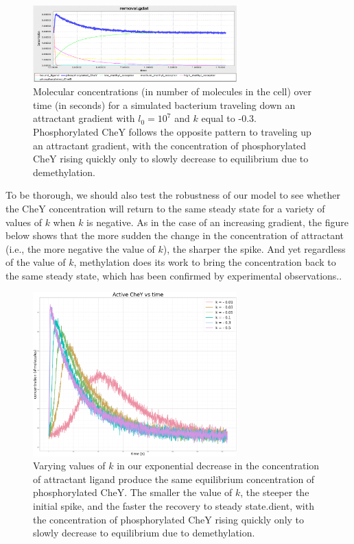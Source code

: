 \begin{figure}[h]
\centering
\mySfFamily
\includegraphics[width = 0.7\textwidth]{../images/chemotaxis_tutorial_removal01.png}
\caption{Molecular concentrations (in number of molecules in the cell) over time (in seconds) for a simulated bacterium traveling down an attractant gradient with $l_0 = 10^7$ and $k$ equal to -0.3. Phosphorylated CheY follows the opposite pattern to traveling up an attractant gradient, with the concentration of phosphorylated CheY rising quickly only to slowly decrease to equilibrium due to demethylation.}
\label{fig:chemotaxis_tutorial_removal01}
\end{figure}


To be thorough, we should also test the robustness of our model to see whether the CheY concentration will return to the same steady state for a variety of values of $k$ when $k$ is negative. As in the case of an increasing gradient, the figure below shows that the more sudden the change in the concentration of attractant (i.e., the more negative the value of $k$), the sharper the spike. And yet regardless of the value of $k$, methylation does its work to bring the concentration back to the same steady state, which has been confirmed by experimental observations.\citep{Krembel_2015}.

\begin{figure}[h]
\centering
\mySfFamily
\includegraphics[width = 0.7\textwidth]{../images/chemotaxis_tutorial_removal02.png}
\caption{Varying values of $k$ in our exponential decrease in the concentration of attractant ligand produce the same equilibrium concentration of phosphorylated CheY. The smaller the value of $k$, the steeper the initial spike, and the faster the recovery to steady state.dient, with the concentration of phosphorylated CheY rising quickly only to slowly decrease to equilibrium due to demethylation.}
\label{fig:chemotaxis_tutorial_removal02}
\end{figure}

